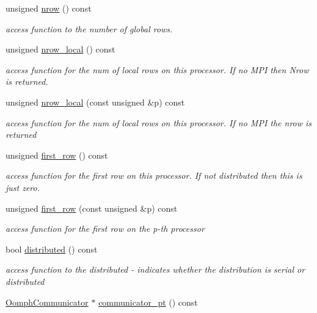 \begin{DoxyCompactItemize}
unsigned \hyperlink{classoomph_1_1LinearAlgebraDistribution_aafad0b69de2284808366b65bd63e493b}{nrow} () const
\begin{DoxyCompactList}\small\item\em access function to the number of global rows. \end{DoxyCompactList}\item 
unsigned \hyperlink{classoomph_1_1LinearAlgebraDistribution_ac9310de740f9c3a61f8d5dab9bef88ca}{nrow\+\_\+local} () const
\begin{DoxyCompactList}\small\item\em access function for the num of local rows on this processor. If no M\+PI then Nrow is returned. \end{DoxyCompactList}\item 
unsigned \hyperlink{classoomph_1_1LinearAlgebraDistribution_aa58810320f461524a5e1181be3477fe7}{nrow\+\_\+local} (const unsigned \&p) const
\begin{DoxyCompactList}\small\item\em access function for the num of local rows on this processor. If no M\+PI the nrow is returned \end{DoxyCompactList}\item 
unsigned \hyperlink{classoomph_1_1LinearAlgebraDistribution_a2634e540a78fe1ee3f5c907aff500b58}{first\+\_\+row} () const
\begin{DoxyCompactList}\small\item\em access function for the first row on this processor. If not distributed then this is just zero. \end{DoxyCompactList}\item 
unsigned \hyperlink{classoomph_1_1LinearAlgebraDistribution_a128e0a982fdbfd658b261981c9740b20}{first\+\_\+row} (const unsigned \&p) const
\begin{DoxyCompactList}\small\item\em access function for the first row on the p-\/th processor \end{DoxyCompactList}\item 
bool \hyperlink{classoomph_1_1LinearAlgebraDistribution_a05842d032d28880ae37951deae804ad8}{distributed} () const
\begin{DoxyCompactList}\small\item\em access function to the distributed -\/ indicates whether the distribution is serial or distributed \end{DoxyCompactList}\item 
\hyperlink{classoomph_1_1OomphCommunicator}{Oomph\+Communicator} $\ast$ \hyperlink{classoomph_1_1LinearAlgebraDistribution_a2e4736826a65253f574d4f6f152ab514}{communicator\+\_\+pt} () const

\end{DoxyCompactItemize}
